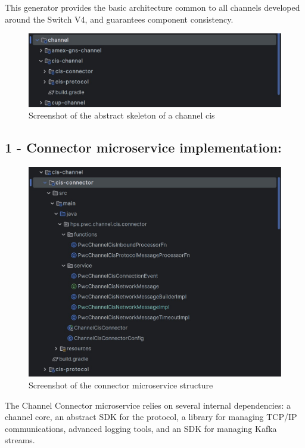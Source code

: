 \documentclass[12pt,a4paper]{report}
\begin{document}
This generator provides the basic architecture common to all channels
developed around the Switch V4, and guarantees component consistency.
\begin{figure}[H]
\centering
\includegraphics[width=\textwidth,height=\textheight,keepaspectratio]{media/image62.jpg}
\caption{Screenshot of the abstract skeleton of a channel cis}
\label{fig:ASC}
\end{figure} 




\subsection{1 - Connector microservice implementation:}

\begin{figure}[H]
\centering
\includegraphics[width=\textwidth,height=\textheight,keepaspectratio]{media/image63.jpg}
\caption{Screenshot of the connector microservice structure}
\label{fig:CMS}
\end{figure} 

The Channel Connector microservice relies on several internal
dependencies: a channel core, an abstract SDK for the protocol, a
library for managing TCP/IP communications, advanced logging tools, and
an SDK for managing Kafka streams.
\end{document}
